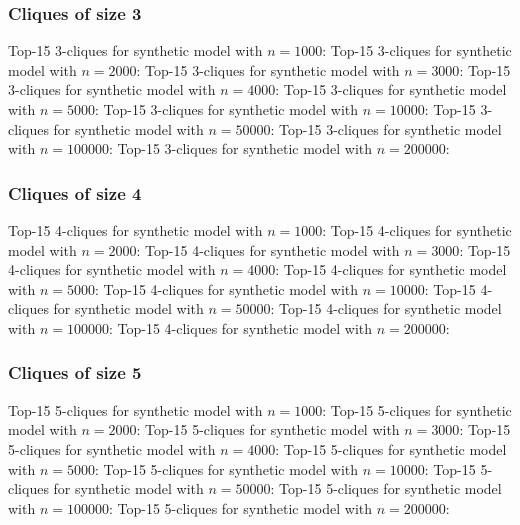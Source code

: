 \documentclass[a4paper,11pt]{article}
\newcommand{\qr}[3]{\noindent{}Top-15 #2 for #3:{\scriptsize}}
\begin{document}
\newpage
\subsubsection{Cliques of size 3}

\qr{synth-1000.query.3cliques}{3-cliques}{synthetic model with \(n=1000\)}
\qr{synth-2000.query.3cliques}{3-cliques}{synthetic model with \(n=2000\)}
\qr{synth-3000.query.3cliques}{3-cliques}{synthetic model with \(n=3000\)}
\qr{synth-4000.query.3cliques}{3-cliques}{synthetic model with \(n=4000\)}
\qr{synth-5000.query.3cliques}{3-cliques}{synthetic model with \(n=5000\)}
\qr{synth-10000.query.3cliques}{3-cliques}{synthetic model with \(n=10000\)}
\qr{synth-50000.query.3cliques}{3-cliques}{synthetic model with \(n=50000\)}
\qr{synth-100000.query.3cliques}{3-cliques}{synthetic model with \(n=100000\)}
\qr{synth-200000.query.3cliques}{3-cliques}{synthetic model with \(n=200000\)}

\newpage
\subsubsection{Cliques of size 4}

\qr{synth-1000.query.4cliques}{4-cliques}{synthetic model with \(n=1000\)}
\qr{synth-2000.query.4cliques}{4-cliques}{synthetic model with \(n=2000\)}
\qr{synth-3000.query.4cliques}{4-cliques}{synthetic model with \(n=3000\)}
\qr{synth-4000.query.4cliques}{4-cliques}{synthetic model with \(n=4000\)}
\qr{synth-5000.query.4cliques}{4-cliques}{synthetic model with \(n=5000\)}
\qr{synth-10000.query.4cliques}{4-cliques}{synthetic model with \(n=10000\)}
\qr{synth-50000.query.4cliques}{4-cliques}{synthetic model with \(n=50000\)}
\qr{synth-100000.query.4cliques}{4-cliques}{synthetic model with \(n=100000\)}
\qr{synth-200000.query.4cliques}{4-cliques}{synthetic model with \(n=200000\)}

\newpage
\subsubsection{Cliques of size 5}

\qr{synth-1000.query.5cliques}{5-cliques}{synthetic model with \(n=1000\)}
\qr{synth-2000.query.5cliques}{5-cliques}{synthetic model with \(n=2000\)}
\qr{synth-3000.query.5cliques}{5-cliques}{synthetic model with \(n=3000\)}
\qr{synth-4000.query.5cliques}{5-cliques}{synthetic model with \(n=4000\)}
\qr{synth-5000.query.5cliques}{5-cliques}{synthetic model with \(n=5000\)}
\qr{synth-10000.query.5cliques}{5-cliques}{synthetic model with \(n=10000\)}
\qr{synth-50000.query.5cliques}{5-cliques}{synthetic model with \(n=50000\)}
\qr{synth-100000.query.5cliques}{5-cliques}{synthetic model with \(n=100000\)}
\qr{synth-200000.query.5cliques}{5-cliques}{synthetic model with \(n=200000\)}
\end{document}
